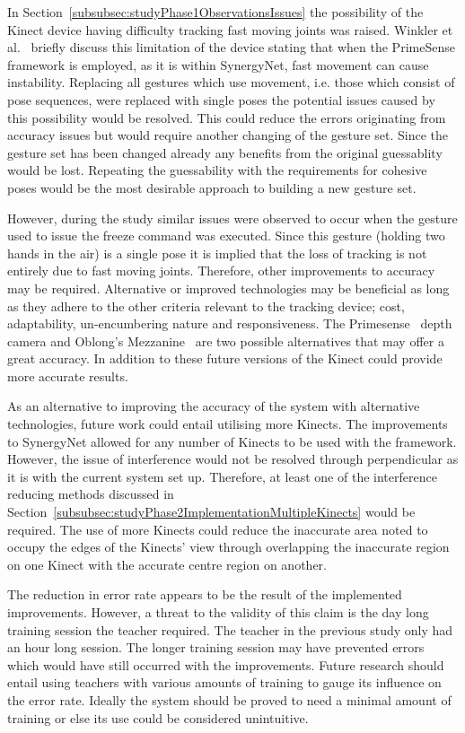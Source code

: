 \documentclass[link]{IWCOMP}
\begin{document}
In Section~\ref{subsubsec:studyPhase1ObservationsIssues} the possibility of the Kinect device having difficulty tracking fast moving joints was raised.
Winkler et al.~\cite{Winkler2012} briefly discuss this limitation of the device stating that when the PrimeSense framework is employed, as it is within SynergyNet, fast movement can cause instability.
Replacing all gestures which use movement, i.e. those which consist of pose sequences, were replaced with single poses the potential issues caused by this possibility would be resolved.
This could reduce the errors originating from accuracy issues but would require another changing of the gesture set.
Since the gesture set has been changed already any benefits from the original guessablity would be lost.
Repeating the guessability with the requirements for cohesive poses would be the most desirable approach to building a new gesture set.

However, during the study similar issues were observed to occur when the gesture used to issue the freeze command was executed.
Since this gesture (holding two hands in the air) is a single pose it is implied that the loss of tracking is not entirely due to fast moving joints.
Therefore, other improvements to accuracy may be required.
Alternative or improved technologies may be beneficial as long as they adhere to the other criteria relevant to the tracking device; cost, adaptability, un-encumbering nature and responsiveness.
The Primesense~\cite{Wilson2010} depth camera and Oblong's Mezzanine~\cite{kramer2011} are two possible alternatives that may offer a great accuracy.
In addition to these future versions of the Kinect could provide more accurate results.

As an alternative to improving the accuracy of the system with alternative technologies, future work could entail utilising more Kinects.
The improvements to SynergyNet allowed for any number of Kinects to be used with the framework.
However, the issue of interference would not be resolved through perpendicular as it is with the current system set up.
Therefore, at least one of the interference reducing methods discussed in Section~\ref{subsubsec:studyPhase2ImplementationMultipleKinects} would be required.
The use of more Kinects could reduce the inaccurate area noted to occupy the edges of the Kinects' view through overlapping the inaccurate region on one Kinect with the accurate centre region on another.

The reduction in error rate appears to be the result of the implemented improvements.
However, a threat to the validity of this claim is the day long training session the teacher required.
The teacher in the previous study only had an hour long session.
The longer training session may have prevented errors which would have still occurred with the improvements.
Future research should entail using teachers with various amounts of training to gauge its influence on the error rate.
Ideally the system should be proved to need a minimal amount of training or else its use could be considered unintuitive.
\end{document}
